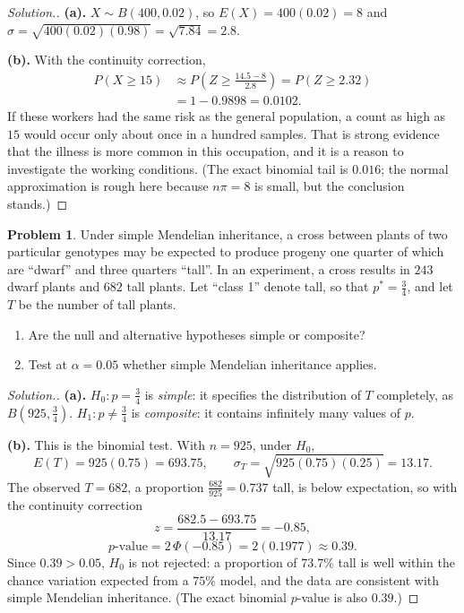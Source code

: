 \documentclass[11pt,a4paper]{article}
\theoremstyle{definition}
\newtheorem{problemx}{Problem}[section]
\newenvironment{problem}{\begin{problemx}}{\end{problemx}}
\newenvironment{solution}
  {\renewcommand{\qedsymbol}{}\begin{proof}[\textit{Solution}.]}
  {\end{proof}}
\begin{document}
\begin{solution}
\textbf{(a).} $X\sim B(400, 0.02)$, so $E(X) = 400(0.02) = 8$ and
$\sigma = \sqrt{400(0.02)(0.98)} = \sqrt{7.84} = 2.8$.

\textbf{(b).} With the continuity correction,
\begin{align*}
P(X\geq 15)&\approx P\left(Z\geq\frac{14.5-8}{2.8}\right) = P(Z\geq 2.32)\\
&= 1-0.9898 = 0.0102.
\end{align*}
If these workers had the same risk as the general population, a count as high as
$15$ would occur only about once in a hundred samples. That is strong evidence that
the illness is more common in this occupation, and it is a reason to investigate the
working conditions. (The exact binomial tail is $0.016$; the normal approximation is
rough here because $n\pi = 8$ is small, but the conclusion stands.)
\end{solution}

\begin{problem}
Under simple Mendelian inheritance, a cross between plants of two particular genotypes
may be expected to produce progeny one quarter of which are ``dwarf'' and three
quarters ``tall''. In an experiment, a cross results in $243$ dwarf plants and $682$
tall plants. Let ``class 1'' denote tall, so that $p^{*} = \frac34$, and let $T$ be the
number of tall plants.
\begin{enumerate}
\item[(a).] Are the null and alternative hypotheses simple or composite?
\item[(b).] Test at $\alpha = 0.05$ whether simple Mendelian inheritance applies.
\end{enumerate}
\end{problem}

\begin{solution}
\textbf{(a).} $H_0: p = \frac34$ is \emph{simple}: it specifies the distribution of $T$
completely, as $B\left(925, \frac34\right)$. $H_1: p\neq\frac34$ is \emph{composite}: it
contains infinitely many values of $p$.

\textbf{(b).} This is the binomial test. With $n = 925$, under $H_0$,
\[E(T) = 925(0.75) = 693.75,\qquad \sigma_T = \sqrt{925(0.75)(0.25)} = 13.17.\]
The observed $T = 682$, a proportion $\frac{682}{925} = 0.737$ tall, is below
expectation, so with the continuity correction
\[z = \frac{682.5-693.75}{13.17} = -0.85,\]
\[p\text{-value} = 2\,\Phi(-0.85) = 2(0.1977)\approx 0.39.\]
Since $0.39 > 0.05$, $H_0$ is not rejected: a proportion of $73.7\%$ tall is well within
the chance variation expected from a $75\%$ model, and the data are consistent with
simple Mendelian inheritance. (The exact binomial $p$-value is also $0.39$.)
\end{solution}
\end{document}
